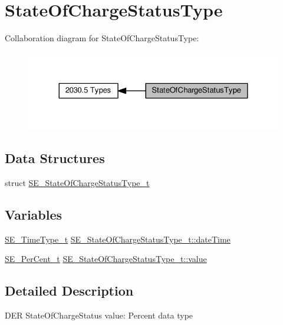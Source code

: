 \hypertarget{group__StateOfChargeStatusType}{}\section{State\+Of\+Charge\+Status\+Type}
\label{group__StateOfChargeStatusType}
Collaboration diagram for State\+Of\+Charge\+Status\+Type\+:\nopagebreak
\begin{figure}[H]
\begin{center}
\leavevmode
\includegraphics[width=324pt]{group__StateOfChargeStatusType}
\end{center}
\end{figure}
\subsection*{Data Structures}
\begin{DoxyCompactItemize}
\item 
struct \hyperlink{structSE__StateOfChargeStatusType__t}{S\+E\+\_\+\+State\+Of\+Charge\+Status\+Type\+\_\+t}
\end{DoxyCompactItemize}
\subsection*{Variables}
\begin{DoxyCompactItemize}
\item 
\hyperlink{group__TimeType_ga6fba87a5b57829b4ff3f0e7638156682}{S\+E\+\_\+\+Time\+Type\+\_\+t} \hyperlink{group__StateOfChargeStatusType_gabbb370a0df0f72f770564a96dad0e5b4}{S\+E\+\_\+\+State\+Of\+Charge\+Status\+Type\+\_\+t\+::date\+Time}
\item 
\hyperlink{group__PerCent_ga14278cbee754c63496035b722b417ddc}{S\+E\+\_\+\+Per\+Cent\+\_\+t} \hyperlink{group__StateOfChargeStatusType_ga7eb72659a38d7f837b71a6ff4997083e}{S\+E\+\_\+\+State\+Of\+Charge\+Status\+Type\+\_\+t\+::value}
\end{DoxyCompactItemize}


\subsection{Detailed Description}
D\+ER State\+Of\+Charge\+Status value\+: Percent data type 


